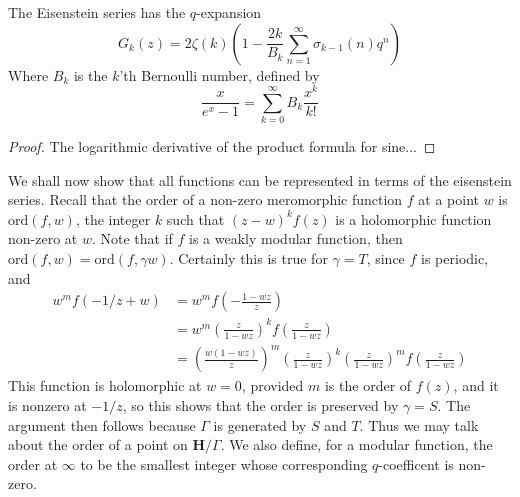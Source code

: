 \begin{theorem}
    The Eisenstein series has the $q$-expansion
    \[ G_k(z) = 2 \zeta(k) \left( 1 - \frac{2k}{B_k} \sum_{n = 1}^\infty \sigma_{k-1}(n) q^n \right) \]
    Where $B_k$ is the $k$'th Bernoulli number, defined by
    \[ \frac{x}{e^x - 1} = \sum_{k = 0}^\infty B_k \frac{x^k}{k!} \]
\end{theorem}
\begin{proof}
    The logarithmic derivative of the product formula for sine...
\end{proof}

We shall now show that all functions can be represented in terms of the eisenstein series. Recall that the order of a non-zero meromorphic function $f$ at a point $w$ is $\text{ord}(f,w)$, the integer $k$ such that $(z - w)^k f(z)$ is a holomorphic function non-zero at $w$. Note that if $f$ is a weakly modular function, then $\text{ord}(f,w) = \text{ord}(f, \gamma w)$. Certainly this is true for $\gamma = T$, since $f$ is periodic, and
%
\begin{align*}
    w^m f(-1/z + w) &= w^m f\left( -\frac{1-wz}{z} \right)\\
    &= w^m \left( \frac{z}{1 - wz} \right)^k f \left( \frac{z}{1 - wz} \right)\\
    &= \left( \frac{w (1 - wz)}{z} \right)^m \left( \frac{z}{1 - wz} \right)^k \left( \frac{z}{1 - wz} \right)^m f\left( \frac{z}{1 - wz} \right)
\end{align*}
%
This function is holomorphic at $w = 0$, provided $m$ is the order of $f(z)$, and it is nonzero at $-1/z$, so this shows that the order is preserved by $\gamma = S$. The argument then follows because $\Gamma$ is generated by $S$ and $T$. Thus we may talk about the order of a point on $\mathbf{H} / \Gamma$. We also define, for a modular function, the order at $\infty$ to be the smallest integer whose corresponding $q$-coefficent is non-zero.

